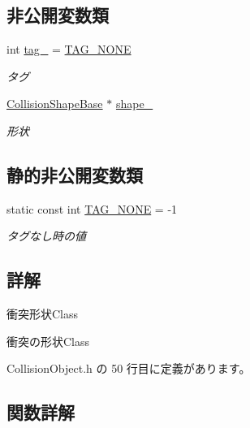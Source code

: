 \subsection*{非公開変数類}
\begin{DoxyCompactItemize}
\item 
int \mbox{\hyperlink{class_collision_object_1_1_shape_a5625e1edc8e8f4875129ca5fb77122c7}{tag\+\_\+}} = \mbox{\hyperlink{class_collision_object_1_1_shape_a8dd1983c15c44855b81081b72705bd3f}{T\+A\+G\+\_\+\+N\+O\+NE}}
\begin{DoxyCompactList}\small\item\em タグ \end{DoxyCompactList}\item 
\mbox{\hyperlink{class_collision_shape_base}{Collision\+Shape\+Base}} $\ast$ \mbox{\hyperlink{class_collision_object_1_1_shape_a7c2d20af409250b51e425a8aa62766f0}{shape\+\_\+}}
\begin{DoxyCompactList}\small\item\em 形状 \end{DoxyCompactList}\end{DoxyCompactItemize}
\subsection*{静的非公開変数類}
\begin{DoxyCompactItemize}
\item 
static const int \mbox{\hyperlink{class_collision_object_1_1_shape_a8dd1983c15c44855b81081b72705bd3f}{T\+A\+G\+\_\+\+N\+O\+NE}} = -\/1
\begin{DoxyCompactList}\small\item\em タグなし時の値 \end{DoxyCompactList}\end{DoxyCompactItemize}


\subsection{詳解}
衝突形状\+Class 

衝突の形状\+Class 

 Collision\+Object.\+h の 50 行目に定義があります。



\subsection{関数詳解}
\mbox{\label{class_collision_object_1_1_shape_a4152f043bde34b7d704f163ab1dd87b8}} 
